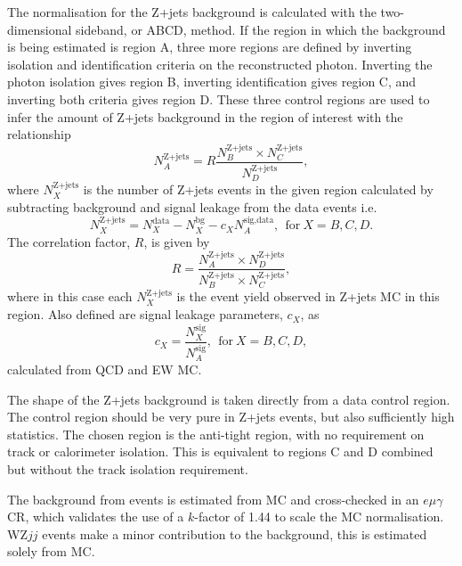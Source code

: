 The normalisation for the Z+jets background is calculated with the
two-dimensional sideband, or ABCD, method.
If the region in which the background is being estimated is region A, three more
regions are defined by inverting isolation and identification criteria on the
reconstructed photon. Inverting the photon isolation gives region B, inverting
identification gives region C, and inverting both criteria gives region D. These
three control regions are used to infer the amount of Z+jets background in the
region of interest with the relationship
%
\begin{equation*}
  \newcommand\Zj{\text{Z+jets}}
  N_A^\Zj = R\frac{N_B^\Zj \times N_C^\Zj}{N_D^\Zj},
\end{equation*}
%
where $N_X^\text{Z+jets}$ is the number of Z+jets events in the given region
calculated by subtracting background and signal leakage from the data events
i.e.
%
\begin{equation*}
  \newcommand\Zj{\text{Z+jets}}
  N_X^\Zj = N_X^\text{data} - N_X^\text{bg} - c_X N_A^\text{sig,data},
  ~~\text{for}~X=B,C,D.
\end{equation*}
%
The correlation factor, $R$, is given by
%
\begin{equation*}
  \newcommand\Zj{\text{Z+jets}}
  R = \frac{ N_A^\Zj \times N_D^\Zj }{ N_B^\Zj \times N_C^\Zj },
\end{equation*}
%
where in this case each $N_X^\text{Z+jets}$ is the event yield observed in
Z+jets \ac{MC} in this region. Also defined are signal leakage parameters,
$c_X$, as
\begin{equation*}
  \newcommand\tsig{\text{sig}}
  c_X = \frac{N_X^\tsig}{N_A^\tsig},
  ~~\text{for}~X=B,C,D,
\end{equation*}
calculated from \ac{QCD} and \ac{EW} \Zy \ac{MC}.

The shape of the Z+jets background is taken directly from a data control region.
The control region should be very pure in Z+jets events, but also sufficiently
high statistics. The chosen region is the anti-tight region, with no requirement
on track or calorimeter isolation. This is equivalent to regions C and D
combined but without the track isolation requirement.

The background from \tty events is estimated from \ac{MC} and cross-checked in
an $e\mu\gamma$ \ac{CR}, which validates the use of a $k$-factor of 1.44 to
scale the \ac{MC} normalisation. WZ$jj$ events make a minor contribution to the
background, this is estimated solely from \ac{MC}.
